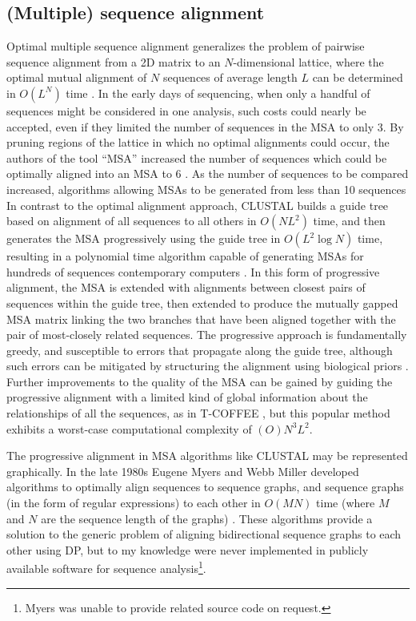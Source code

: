\subsection{(Multiple) sequence alignment}

Optimal multiple sequence alignment generalizes the problem of pairwise sequence alignment from a 2D matrix to an $N$-dimensional lattice, where the optimal mutual alignment of $N$ sequences of average length $L$ can be determined in $O(L^{N})$ time \cite{carrillo1988multiple}.
In the early days of sequencing, when only a handful of sequences might be considered in one analysis, such costs could nearly be accepted, even if they limited the number of sequences in the MSA to only 3.
By pruning regions of the lattice in which no optimal alignments could occur, the authors of the tool ``MSA'' increased the number of sequences which could be optimally aligned into an MSA to 6 \cite{lipman1989tool}.
As the number of sequences to be compared increased, algorithms allowing MSAs to be generated from less than 10 sequences
In contrast to the optimal alignment approach, CLUSTAL builds a guide tree based on alignment of all sequences to all others in $O(NL^{2})$ time, and then generates the MSA progressively using the guide tree in $O(L^{2}\log N)$ time, resulting in a polynomial time algorithm capable of generating MSAs for hundreds of sequences contemporary computers \cite{higgins1988clustal}.
In this form of progressive alignment, the MSA is extended with alignments between closest pairs of sequences within the guide tree, then extended to produce the mutually gapped MSA matrix linking the two branches that have been aligned together with the pair of most-closely related sequences.
The progressive approach is fundamentally greedy, and susceptible to errors that propagate along the guide tree, although such errors can be mitigated by structuring the alignment using biological priors \cite{thompson1994clustal}.
Further improvements to the quality of the MSA can be gained by guiding the progressive alignment with a limited kind of global information about the relationships of all the sequences, as in T-COFFEE \cite{notredame2000t}, but this popular method exhibits a worst-case computational complexity of $(O)N^{3}L^{2}$.

The progressive alignment in MSA algorithms like CLUSTAL may be represented graphically.
In the late 1980s Eugene Myers and Webb Miller developed algorithms to optimally align sequences to sequence graphs, and sequence graphs (in the form of regular expressions) to each other in $O(MN)$ time (where $M$ and $N$ are the sequence length of the graphs) \cite{myers1989approximate}.
These algorithms provide a solution to the generic problem of aligning bidirectional sequence graphs to each other using DP, but to my knowledge were never implemented in publicly available software for sequence analysis\footnote{Myers was unable to provide related source code on request.}.

